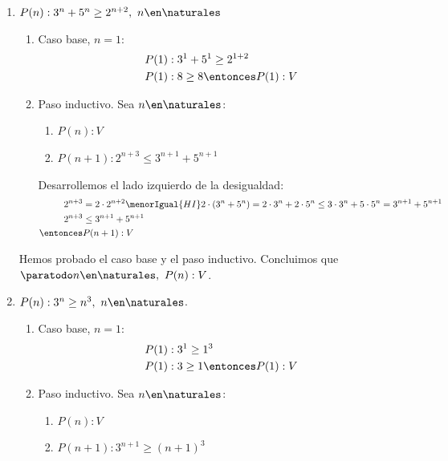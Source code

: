 \begin{enumerate}[label=\magenta{\roman*)}]
  \item $P(n): 3^n + 5^n \geq 2^{n+2},\ n \en \naturales$
        \begin{enumerate}[label=\arabic*)]
          \item Caso base, $n = 1$:
                \begin{align*}
                  P(1) & : 3^1 + 5^1 \geq 2^{1+2}     \\
                  P(1) & : 8 \geq 8 \entonces P(1): V
                \end{align*}
          \item Paso inductivo. Sea $n \en \naturales$:
                \begin{enumerate}
                  \item[HI.] $P(n): V$
                  \item[TI.] $P(n+1): 2^{n+3} \leq 3^{n+1} + 5^{n+1}$
                \end{enumerate}

                Desarrollemos el lado izquierdo de la desigualdad:
                \begin{align*}
                  2^{n+3}   & = 2 \cdot 2^{n+2} \menorIgual{HI} 2 \cdot (3^n + 5^n) = 2 \cdot 3^n + 2 \cdot 5^n \leq
                  3 \cdot 3^n + 5 \cdot 5^n = 3^{n+1} + 5^{n+1}                                                      \\
                  2^{n+3}   & \leq 3^{n+1} + 5^{n+1}                                                                 \\
                  \entonces & P(n+1): V
                \end{align*}
        \end{enumerate}

        Hemos probado el caso base y el paso inductivo. Concluimos que $\paratodo n \en \naturales, \ P(n): V$.

  \item $P(n): 3^n \geq n^3, \ n \en \naturales$.
        \begin{enumerate}[label=\arabic*)]
          \item Caso base, $n = 1$:
                \begin{align*}
                  P(1) & : 3^1 \geq 1^3               \\
                  P(1) & : 3 \geq 1 \entonces P(1): V
                \end{align*}
          \item Paso inductivo. Sea $n \en \naturales$:
                \begin{enumerate}
                  \item[HI.] $P(n): V$
                  \item[TI.] $P(n+1): 3^{n+1} \geq (n+1)^3$
                \end{enumerate}


\end{enumerate}
\end{enumerate}
